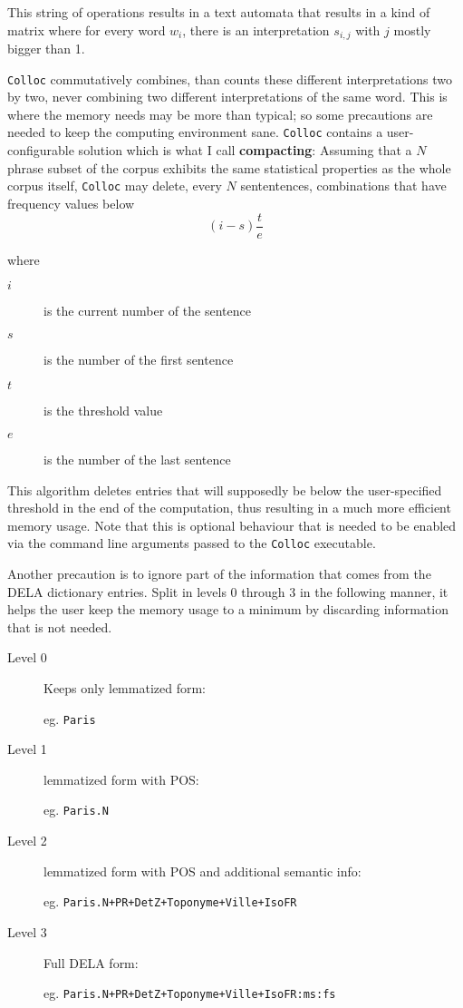 \documentclass[a4paper,12pt,oneside]{article}
\begin{document}
This string of operations results in a text automata that results in a kind of matrix where for every word $w_i$, there is an interpretation $s_{i,j}$ with $j$ mostly bigger than 1.

\texttt{Colloc} commutatively combines, than counts these different interpretations two by two, never combining two different interpretations of the same word. This is where the memory needs may be more than typical; so some precautions are needed to keep the computing environment sane. \texttt{Colloc} contains a user-configurable solution which is what I call \textbf{compacting}: Assuming that a $N$ phrase subset of the corpus exhibits the same statistical properties as the whole corpus itself, \texttt{Colloc} may delete, every $N$ sententences, combinations that have frequency values below $$(i-s)\frac{t}{e}$$

where
\begin{small}
	\begin{description}
		\item[$i$] is the current number of the sentence
		\item[$s$] is the number of the first sentence
		\item[$t$] is the threshold value
		\item[$e$] is the number of the last sentence
	\end{description}
\end{small}

This algorithm deletes entries that will supposedly be below the user-specified threshold in the end of the computation, thus resulting in a much more efficient memory usage. Note that this is optional behaviour that is needed to be enabled via the command line arguments passed to the \texttt{Colloc} executable.

Another precaution is to ignore part of the information that comes from the DELA dictionary entries. Split in levels 0 through 3 in the following manner, it helps the user keep the memory usage to a minimum by discarding information that is not needed.
	\begin{description}
		\item [Level 0] 
			Keeps only lemmatized form:

		      eg. \texttt{Paris}
		\item [Level 1] lemmatized form with POS:

		      eg. \texttt{Paris.N}
		\item [Level 2] lemmatized form with POS and additional semantic info:

		      eg. \texttt{Paris.N+PR+DetZ+Toponyme+Ville+IsoFR}
		\item [Level 3] Full DELA form:

		      eg. \texttt{Paris.N+PR+DetZ+Toponyme+Ville+IsoFR:ms:fs}
	\end{description}
\end{document}

